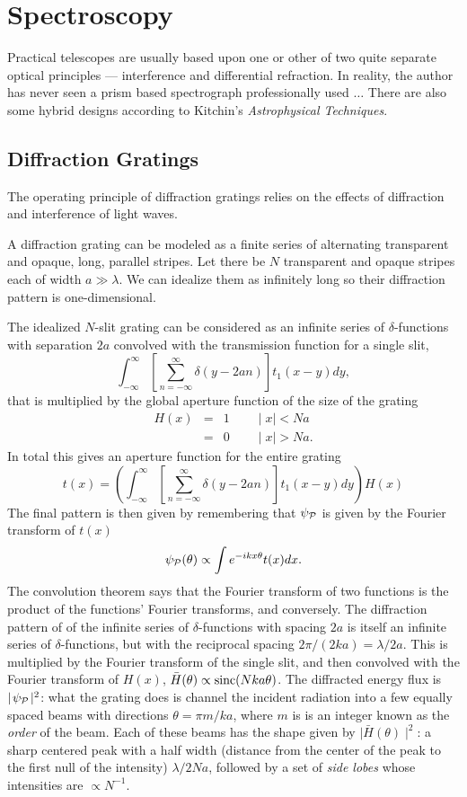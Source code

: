 \documentclass{article}
\newcommand{\bua}{\begin{eqnarray*}}
\newcommand{\eua}{\end{eqnarray*}}
\def\cl#1{{\cal #1}}               %
\def\labs{\mid\!}
\def\rabs{\!\mid}
\begin{document}
\setcounter{section}{9}
\setcounter{count}{\value{enumi}}
\section{Spectroscopy}

Practical telescopes are usually based upon one or other of two quite separate optical
principles --- interference and differential refraction. In reality, the author has never
seen a prism based spectrograph professionally used $\ldots$ There are also some 
hybrid designs according to Kitchin's {\it Astrophysical Techniques}. 

\subsection{Diffraction Gratings}

The operating principle of diffraction gratings relies on the effects of diffraction 
and interference of light waves. 

A diffraction grating can be modeled as a finite series of alternating transparent 
and opaque, long, parallel stripes. Let there be $N$ transparent and opaque stripes 
each of width $a\gg\lambda$. We can idealize them as infinitely long so their diffraction
pattern is one-dimensional.

The idealized $N$-slit grating can be considered as an infinite series of $\delta$-functions with separation $2a$ convolved with the transmission function
for a single slit,
\[
\int_{-\infty}^{\infty}\left[\sum_{n=-\infty}^{\infty}\delta(y-2an)\right] t_1(x-y)dy,
\]
that is multiplied by the global aperture function of the size of the grating
\bua
H(x)&=&1 \qquad \labs x\rabs<Na \\
      &=&0 \qquad \labs x\rabs>Na.
\eua
In total this gives an aperture function for the entire grating 
\[
t(x)=\left(\int_{-\infty}^{\infty}\left[\sum_{n=-\infty}^{\infty}\delta(y-2an)\right]t_1(x-y)dy\right)H(x)
\]
The final pattern is then given by remembering that $\psi_{\cl{P}}$ is given by the 
Fourier transform of $t(x)$
\[
\psi_\cl{P}({\theta)\propto\int e^{-ikx\theta}}t({x})dx.
\]
The convolution theorem says that the Fourier transform of two functions is the product
of the functions' Fourier transforms, and conversely. The diffraction pattern of of the infinite series of $\delta$-functions with spacing $2a$ is itself an infinite series of $\delta$-functions, but with the reciprocal spacing ${2\pi/(2ka)}={\lambda/2a}$. This
is multiplied by the Fourier transform of the single slit, and then convolved with the
Fourier transform of $H(x)$, $\bar{H}(\theta)\propto{\rm sinc}(Nka\theta)$. The 
diffracted energy flux is $\labs\psi_{\cl{P}}\rabs^2$: what the grating does is channel the
incident radiation into a few equally spaced beams with directions $\theta={\pi m/ka}$,
where $m$ is is an integer known as the {\it order} of the beam. Each of these beams 
has the shape given by $\labs\bar{H}(\theta)\rabs^2$: a sharp centered peak with a
half width (distance from the center of the peak to the first null of the intensity)
${\lambda/2Na}$, followed by a set of {\it side lobes} whose intensities are $\propto N^{-1}$. 
\end{document}
